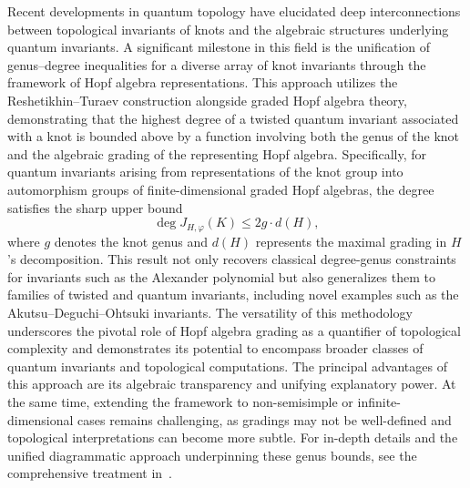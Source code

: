 \documentclass[sigconf]{acmart}
\begin{document}
Recent developments in quantum topology have elucidated deep interconnections between topological invariants of knots and the algebraic structures underlying quantum invariants. A significant milestone in this field is the unification of genus–degree inequalities for a diverse array of knot invariants through the framework of Hopf algebra representations. This approach utilizes the Reshetikhin–Turaev construction alongside graded Hopf algebra theory, demonstrating that the highest degree of a twisted quantum invariant associated with a knot is bounded above by a function involving both the genus of the knot and the algebraic grading of the representing Hopf algebra. Specifically, for quantum invariants arising from representations of the knot group into automorphism groups of finite-dimensional graded Hopf algebras, the degree satisfies the sharp upper bound
\[
\deg J_{H,\varphi}(K) \leq 2g \cdot d(H),
\]
where $g$ denotes the knot genus and $d(H)$ represents the maximal grading in $H$'s decomposition. This result not only recovers classical degree-genus constraints for invariants such as the Alexander polynomial but also generalizes them to families of twisted and quantum invariants, including novel examples such as the Akutsu–Deguchi–Ohtsuki invariants. The versatility of this methodology underscores the pivotal role of Hopf algebra grading as a quantifier of topological complexity and demonstrates its potential to encompass broader classes of quantum invariants and topological computations. The principal advantages of this approach are its algebraic transparency and unifying explanatory power. At the same time, extending the framework to non-semisimple or infinite-dimensional cases remains challenging, as gradings may not be well-defined and topological interpretations can become more subtle. For in-depth details and the unified diagrammatic approach underpinning these genus bounds, see the comprehensive treatment in~\cite{ref90}.
\end{document}

